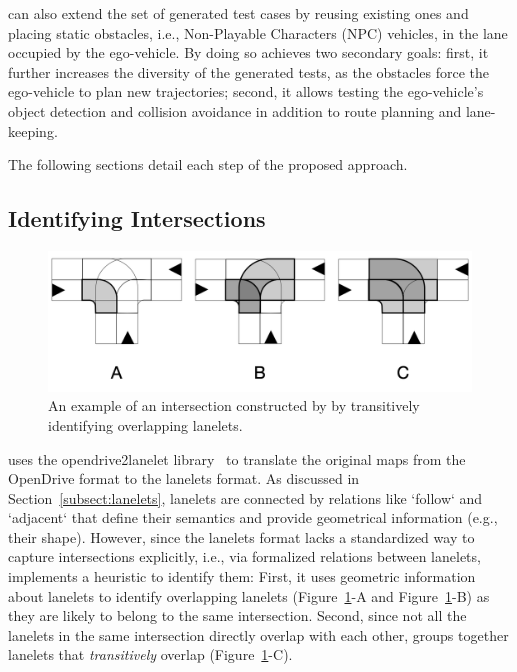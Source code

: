 \documentclass[conference]{IEEEtran}
\begin{document}
\tool can also extend the set of generated test cases by reusing existing ones and placing static obstacles, i.e., Non-Playable Characters (NPC) vehicles, in the lane occupied by the ego-vehicle. By doing so \tool achieves two secondary goals: first, it further increases the diversity of the generated tests, as the obstacles force the ego-vehicle to plan new trajectories; second, it allows testing the ego-vehicle's object detection and collision avoidance in addition to route planning and lane-keeping.

The following sections detail each step of the proposed approach.

\subsection{Identifying Intersections}

\begin{figure}
  \centering
    \includegraphics[width=0.95\columnwidth]{images/overlapping}
  \caption{An example of an intersection constructed by \tool by transitively identifying overlapping lanelets.}
  \label{fig:overlapping}
\end{figure}

\tool uses the opendrive2lanelet library~\cite{althoff2018automatic} to translate the original maps from the OpenDrive format to the lanelets format. As discussed in Section~\ref{subsect:lanelets}, lanelets are connected by relations like `follow` and `adjacent` that define their semantics and provide geometrical information (e.g., their shape). 
However, since the lanelets format lacks a standardized way to capture intersections explicitly, i.e., via formalized relations between lanelets, \tool implements a heuristic to identify them: 
First, it uses geometric information about lanelets to identify overlapping lanelets (\mbox{Figure~\ref{fig:overlapping}-A} and \mbox{Figure~\ref{fig:overlapping}-B}) as they are likely to belong to the same intersection. Second, since not all the lanelets in the same intersection directly overlap with each other, \tool groups together lanelets that \emph{transitively} overlap (\mbox{Figure~\ref{fig:overlapping}-C}).
\end{document}
